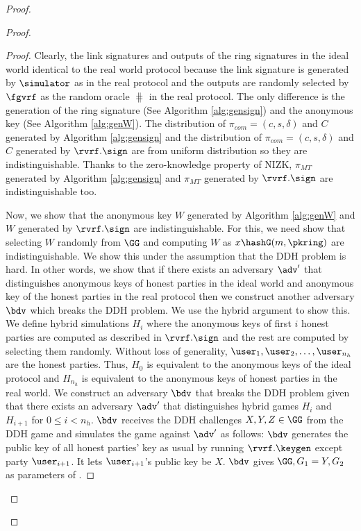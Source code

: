 \begin{proof}
\begin{proof}
		\begin{proof}
			Clearly, the link signatures and outputs of the ring signatures in the ideal world identical to the real world protocol because the link signature is generated by $ \simulator $ as in the real protocol and the outputs are randomly selected by $ \fgvrf $ as the random oracle $ \hash $ in the real protocol. The only difference is the generation of the ring signature (See Algorithm \ref{alg:gensign}) and the anonymous key (See Algorithm \ref{alg:genW}). The distribution of $ \pi_{com} = (c,s,\delta) $ and $ C $ generated by Algorithm \ref{alg:gensign} and the distribution of $ \pi_{com} = (c,s,\delta) $ and $ C $ generated by $ \rvrf.\sign $ are from uniform distribution so they are indistinguishable. Thanks to the zero-knowledge property of NIZK, $ \pi_{MT} $ generated by Algorithm \ref{alg:gensign} and $ \pi_{MT} $ generated by $ \rvrf.\sign $ are indistinguishable too.  
			
			Now, we show that the anonymous key $ W $ generated by Algorithm \ref{alg:genW} and $	 W $ generated by $ \rvrf.\sign $ are indistinguishable. For this,  we need show that selecting $ W $ randomly from $ \GG $ and computing $ W $ as $x \hashG(m, \pkring) $ are indistinguishable.
			We  show this under the assumption that the DDH problem  is hard.  In other words, we show that if there exists an adversary $ \adv' $ that distinguishes anonymous keys of honest parties in the ideal world and anonymous key of the honest parties in the real protocol then we construct another adversary $ \bdv $ which breaks the DDH problem. 
			We use the hybrid argument to show this.
			We define hybrid simulations $ H_{i} $ where  the anonymous keys of first $ i $ honest parties are computed as described in $ \rvrf.\sign $ and the rest are computed by selecting them randomly. Without loss of generality, $ \user_1, \user_2, \ldots, \user_{n_h} $ are the honest parties. Thus, $ H_0 $ is equivalent to the anonymous keys of the ideal protocol  and $ H_{n_h}  $ is equivalent to the anonymous keys of honest parties in the real world.  We construct an adversary $ \bdv $ that breaks the DDH problem given that there exists an adversary $ \adv' $ that distinguishes hybrid games $ H_i $ and $ H_{i + 1} $ for $ 0 \leq i < n_h $. $\bdv $ receives the DDH challenges $ X,Y, Z \in \GG $ from the DDH game and simulates the game against $ \adv' $ as follows: $\bdv $ generates the public key of all  honest parties' key as usual by running $ \rvrf.\keygen$ except party $ \user_{i+1} $. It lets $ \user_{i+1} $'s public key be $ X $. $ \bdv $ gives $ \GG, G_1 = Y, G_2 $ as parameters of \name. 
			

\end{proof}
\end{proof}
\end{proof}
